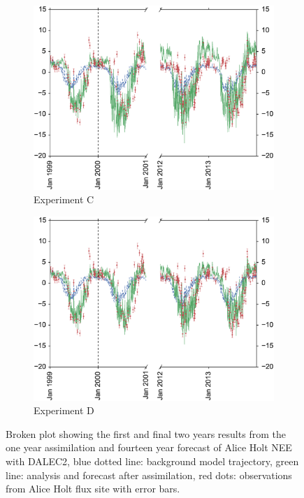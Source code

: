 \documentclass[11pt]{article}
\begin{document}
\begin{figure}
\begin{subfigure}[b]{0.49\textwidth}
        \includegraphics[width=\textwidth]{Cbroke4dvar.eps}
        \caption{Experiment C}
        \label{fig:broke4dvarBcorR}
    \end{subfigure}
    \begin{subfigure}[b]{0.49\textwidth}
        \includegraphics[width=\textwidth]{Dbroke4dvar.eps}
        \caption{Experiment D}
        \label{fig:broke4dvaredcBcorR}
    \end{subfigure}
    \caption{Broken plot showing the first and final two years results from the one year assimilation and fourteen year forecast of Alice Holt NEE with DALEC2, blue dotted line: background model trajectory, green line: analysis and forecast after assimilation, red dots: observations from Alice Holt flux site with error bars.}\label{fig:broke4dvar}
\end{figure}
\end{document}
